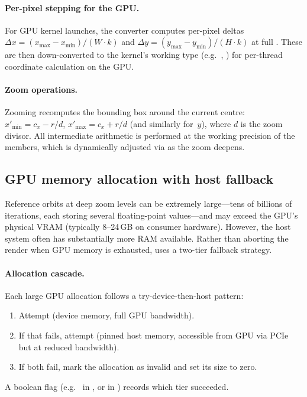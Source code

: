 \paragraph{Per-pixel stepping for the GPU.}
For GPU kernel launches, the converter computes per-pixel deltas
$\Delta x = (x_{\max}-x_{\min})/(W \cdot k)$ and
$\Delta y = (y_{\max}-y_{\min})/(H \cdot k)$ at full
.  These are then down-converted to the
kernel's working type (e.g.\ , ) for
per-thread coordinate calculation on the GPU.

\paragraph{Zoom operations.}
Zooming recomputes the bounding box around the current centre:
$x'_{\min} = c_x - r/d$, $x'_{\max} = c_x + r/d$ (and similarly
for~$y$), where $d$ is the zoom divisor.  All intermediate arithmetic
is performed at the working precision of the 
members, which is dynamically adjusted via  as
the zoom deepens.

\subsection{GPU memory allocation with host fallback}
\label{subsec:gpu-mem-fallback}

Reference orbits at deep zoom levels can be extremely large---tens of
billions of iterations, each storing several floating-point
values---and may exceed the GPU's physical VRAM (typically 8--24\,GB
on consumer hardware).  However, the host system often has
substantially more RAM available.  Rather than aborting the render
when GPU memory is exhausted, \FractalShark{} uses a two-tier
fallback strategy.

\paragraph{Allocation cascade.}
Each large GPU allocation follows a try-device-then-host pattern:
\begin{enumerate}
\item Attempt  (device memory, full GPU bandwidth).
\item If that fails, attempt 
      (pinned host memory, accessible from GPU via PCIe but at
      reduced bandwidth).
\item If both fail, mark the allocation as invalid and set
      its size to zero.
\end{enumerate}
A boolean flag (e.g.\  in
, or  in
) records which tier succeeded.

